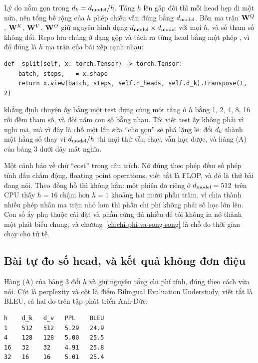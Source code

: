 Lý do nằm gọn trong \(d_{k} = d_{\mathrm{model}}/h\). Tăng \(h\) lên gấp đôi thì mỗi head hẹp
đi một nửa, nên tổng bề rộng của \(h\) phép chiếu vẫn đúng bằng \(d_{\mathrm{model}}\).
Bốn ma trận \(\mathbf{W}^Q\), \(\mathbf{W}^K\), \(\mathbf{W}^V\), \(\mathbf{W}^O\) giữ
nguyên hình dạng \(d_{\mathrm{model}} \times d_{\mathrm{model}}\) với mọi \(h\), và số tham số không
đổi. Repo lưu chúng ở dạng gộp và tách ra từng head bằng một phép , vì đó
đúng là \(h\) ma trận của bài xếp cạnh nhau:

\begin{verbatim}
def _split(self, x: torch.Tensor) -> torch.Tensor:
    batch, steps, _ = x.shape
    return x.view(batch, steps, self.n_heads, self.d_k).transpose(1, 2)
\end{verbatim}

 khẳng định chuyện ấy bằng một test dựng cùng một tầng
ở \(h\) bằng 1, 2, 4, 8, 16 rồi đếm tham số, và đòi năm con số bằng nhau. Tôi
viết test ấy không phải vì nghi mã, mà vì đây là chỗ một lần sửa \enquote{cho
gọn} sẽ phá lặng lẽ: đổi \(d_{k}\) thành một hằng số thay vì \(d_{\mathrm{model}}/h\) thì mọi
thứ vẫn chạy, vẫn học được, và hàng (A) của bảng 3 dưới đây mất nghĩa.

%
Một cảnh báo về chữ \enquote{cost} trong câu trích. Nó đúng theo phép đếm số
phép tính dấu chấm động, floating point operations, viết tắt là FLOP,
và đó là thứ bài đang nói. Theo đồng hồ thì không hẳn: một phiên đo riêng ở
\(d_{\mathrm{model}} = 512\) trên CPU thấy \(h = 16\) chậm hơn \(h = 1\) khoảng hai mươi
phần trăm, vì chia thành nhiều phép nhân ma trận nhỏ hơn thì phần chi phí không
phải số học lớn lên. Con số ấy phụ thuộc cài đặt và phần cứng đủ nhiều để tôi
không in nó thành một phát biểu chung, và
chương~\ref{ch:chi-phi-va-song-song} là chỗ đo thời gian chạy cho tử tế.

\subsection*{Bài tự đo số head, và kết quả không đơn điệu}

%
Hàng (A) của bảng 3 đổi \(h\) và giữ nguyên tổng chi phí tính, đúng theo cách
vừa nói. Cột  là perplexity và cột  là điểm Bilingual
Evaluation Understudy, viết tắt là BLEU, cả hai đo trên tập phát triển
Anh-Đức:

\begin{verbatim}
h    d_k   d_v   PPL    BLEU
1    512   512   5.29   24.9
4    128   128   5.00   25.5
16   32    32    4.91   25.8
32   16    16    5.01   25.4
\end{verbatim}

